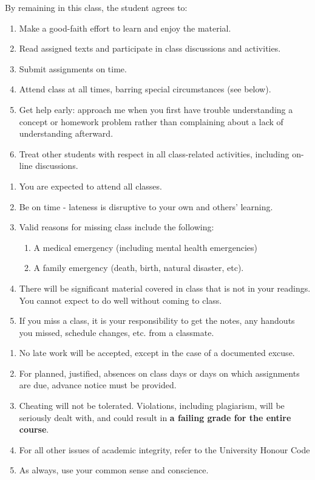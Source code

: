 \documentclass[a4paper,landscape,headrule,footrule,xetex]{foils}
\begin{document}
By remaining in this class, the student agrees to:
\begin{enumerate}
\item  Make a good-faith effort to learn and enjoy the material.
\item  Read assigned texts and participate in class discussions and activities.
\item Submit assignments on time.
\item Attend class at all times, barring special circumstances (see below).
\item Get help early: approach me when you first have trouble understanding a concept or homework problem rather than complaining about a lack of understanding afterward.
\item Treat other students with respect in all class-related activities, including on-line discussions.
\end{enumerate}
\begin{enumerate}
\item You are expected to attend all classes.
\item Be on time - lateness is disruptive to your own and others' learning.
\item Valid reasons for missing class include the following:
\begin{enumerate}
\item A medical emergency (including mental health emergencies)
\item A family emergency (death, birth, natural disaster, etc).
\end{enumerate}
\item There will be significant material covered in class that is not in your readings.  You cannot expect to do well without coming to class.
\item If you miss a class, it is your responsibility to get the notes, any handouts you missed, schedule changes, etc. from a classmate.
\end{enumerate}

\begin{enumerate}
\item No late work will be accepted, except in the case of a documented excuse.
\item For planned, justified, absences on class days or days on which assignments are due, advance notice must be provided.
\item Cheating will not be tolerated. Violations, including plagiarism, will be seriously dealt with, and could result in \textbf{a failing grade for the entire course}.
\item For all other issues of academic integrity, refer to the University Honour Code
\item As always, use your common sense and conscience.
\end{enumerate}
\end{document}
